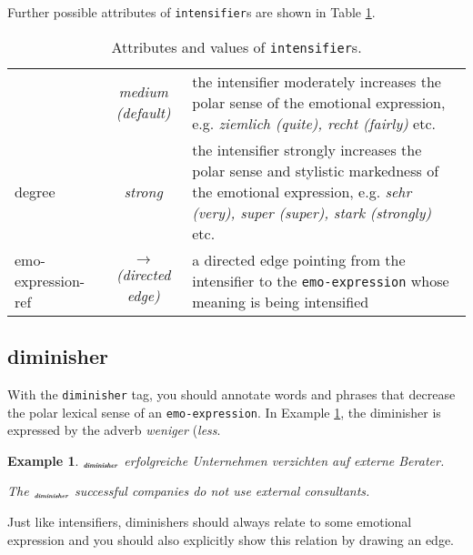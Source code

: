\documentclass[11pt,a4paper]{article}
\newlength{\clmnwidth}
\theoremstyle{mytheoremstyle}
\newtheorem{exmp}{Example}[section]
\newcommand{\mtag}[2]{{\upshape[\emph{#2}\upshape]$_{\textrm{\bfseries\emph{\tiny
        #1}}}$}}
\newcommand{\diminisher}[2][]{\mtag{di\-mi\-ni\-sher\ifstrempty{#1}{}{:#1}}{#2}}
\begin{document}
Further possible attributes of \texttt{intensifier}s are shown in
Table \ref{tbl:intensifier}.
\begin{center}
  \begin{table}[htb]
    \caption{Attributes and values of \texttt{intensifier}s.}
    \begin{tabular}{|l|c|p{0.875\clmnwidth}|}\hline

      & \textit{medium (default)} & the intensifier moderately
      increases the polar sense of the emotional expression,
      e.g. \textit{ziemlich (quite), recht (fairly)} etc.\\\cline{2-3}

      \multirow{-2}{*}{degree} & \textit{strong} & the intensifier
      strongly increases the polar sense and stylistic markedness of the
      emotional expression, e.g. \textit{sehr (very), super (super),
        stark (strongly)} etc.\\\hline


      emo-expression-ref & \textit{$\longrightarrow$\newline(directed
        edge)} & a directed edge pointing from the intensifier to the
      \texttt{emo-expression} whose meaning is being intensified\\\hline
    \end{tabular}
    \label{tbl:intensifier}
  \end{table}
\end{center}

\subsection{diminisher}
With the \texttt{diminisher} tag, you should annotate words and
phrases that decrease the polar lexical sense of an
\texttt{emo-expression}.  In Example \ref{exmp:diminisher}, the
diminisher is expressed by the adverb \textit{weniger} (\textit{less}.
\begin{exmp}
  \diminisher{Weniger} erfolgreiche Unternehmen verzichten auf externe
  Berater.\label{exmp:diminisher}

  The \diminisher{less} successful companies do not use external
  consultants.
\end{exmp}
Just like intensifiers, diminishers should always relate to some
emotional expression and you should also explicitly show this relation
by drawing an edge.
\end{document}
